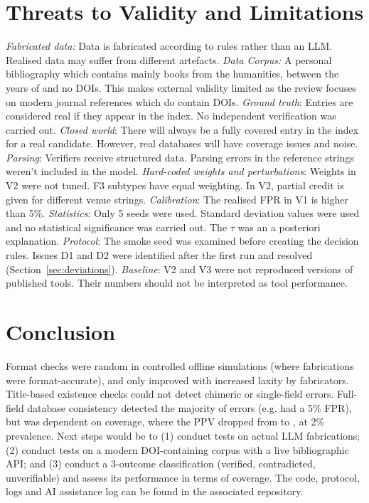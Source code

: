 \section{Threats to Validity and Limitations} \label{sec:threats}
\textit{Fabricated data:} Data is fabricated according to rules rather than an LLM. Realised data may suffer from different artefacts.
\textit{Data Corpus:} A personal bibliography which contains mainly books from the humanities, between the years of \NyearMin{} and \NyearMax{} no DOIs. This makes external validity limited as the review focuses on modern journal references which do contain DOIs. \textit{Ground truth}: Entries are considered real if they appear in the index. No independent verification was carried out.
\textit{Closed world}: There will always be a fully covered entry in the index for a real candidate. However, real databases will have coverage issues and noise.
\textit{Parsing}: Verifiers receive structured data. Parsing errors in the reference strings weren't included in the model.
\textit{Hard-coded weights and perturbations}: Weights in V2 were not tuned. F3 subtypes have equal weighting. In V2, partial credit is given for different venue strings.
\textit{Calibration}: The realised FPR in V1 is higher than 5\%. \textit{Statistics}: Only 5 seeds were used. Standard deviation values were used and no statistical significance was carried out. The $\tau$ was an a posteriori explanation. \textit{Protocol}: The smoke seed was examined before creating the decision rules. Issues D1 and D2 were identified after the first run and resolved (Section~\ref{sec:deviations}). \textit{Baseline}: V2 and V3 were not reproduced versions of published tools. Their numbers should not be interpreted as tool performance.

\section{Conclusion}
Format checks were random in controlled offline simulations (where fabrications were format-accurate), and only improved with increased laxity by fabricators. Title-based existence checks could not detect chimeric or single-field errors. Full-field database consistency detected the majority of errors (e.g. \NVtwoRRec{} had a 5\% FPR),
but was dependent on coverage, where the PPV dropped from \NVtwoPpv{} to \NVtwoPpvHalf{}, at 2\% prevalence. Next steps would be to
(1) conduct tests on actual LLM fabrications; (2) conduct tests on a modern DOI-containing corpus with a live bibliographic API; and (3) conduct a 3-outcome classification (verified, contradicted, unverifiable) and assess its performance in terms of coverage. The code, protocol, logs and AI assistance log can be found in the associated repository.

